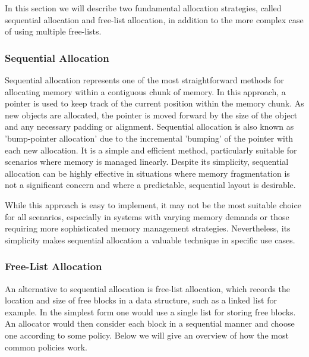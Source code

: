 
In this section we will describe two fundamental allocation strategies, called sequential allocation and free-list allocation, in addition to the more complex case of using multiple free-lists.

\subsubsection{Sequential Allocation}
\label{sec:seq_allocation}
\label{sec:bump_pointer}

Sequential allocation represents one of the most straightforward methods for allocating memory within a contiguous chunk of memory. In this approach, a pointer is used to keep track of the current position within the memory chunk. As new objects are allocated, the pointer is moved forward by the size of the object and any necessary padding or alignment. Sequential allocation is also known as 'bump-pointer allocation' due to the incremental 'bumping' of the pointer with each new allocation. It is a simple and efficient method, particularly suitable for scenarios where memory is managed linearly. Despite its simplicity, sequential allocation can be highly effective in situations where memory fragmentation is not a significant concern and where a predictable, sequential layout is desirable.

While this approach is easy to implement, it may not be the most suitable choice for all scenarios, especially in systems with varying memory demands or those requiring more sophisticated memory management strategies. Nevertheless, its simplicity makes sequential allocation a valuable technique in specific use cases.

\subsubsection{Free-List Allocation}
An alternative to sequential allocation is free-list allocation, which records the location and size of free blocks in a data structure, such as a linked list for example. In the simplest form one would use a single list for storing free blocks. An allocator would then consider each block in a sequential manner and choose one according to some policy. Below we will give an overview of how the most common policies work.

